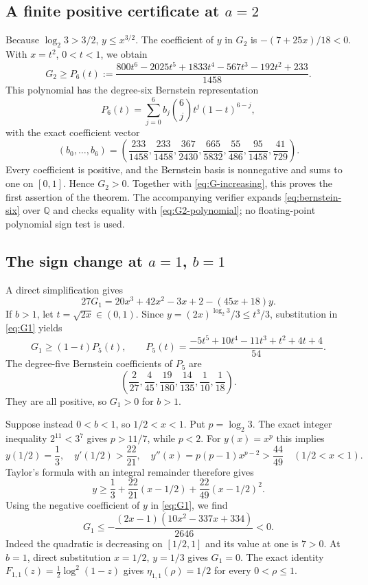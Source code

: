 \subsection{A finite positive certificate at \texorpdfstring{$a=2$}{a = 2}}
Because $\log_2 3>3/2$, $y\le x^{3/2}$. The coefficient of $y$
in $G_2$ is $-(7+25x)/18<0$. With $x=t^2$, $0<t<1$, we obtain
\begin{equation}\label{eq:G2-polynomial}
 G_2\ge P_6(t):=
 \frac{800t^6-2025t^5+1833t^4-567t^3-192t^2+233}{1458}.
\end{equation}
This polynomial has the degree-six Bernstein representation
\[
 P_6(t)=\sum_{j=0}^6 b_j\binom6j t^j(1-t)^{6-j},
\]
with the exact coefficient vector
\begin{equation}\label{eq:bernstein-six}
 (b_0,\ldots,b_6)=
 \left(\frac{233}{1458},\frac{233}{1458},\frac{367}{2430},
 \frac{665}{5832},\frac{55}{486},\frac{95}{1458},\frac{41}{729}\right).
\end{equation}
Every coefficient is positive, and the Bernstein basis is nonnegative
and sums to one on $[0,1]$. Hence $G_2>0$. Together with
\eqref{eq:G-increasing}, this proves the first assertion of the theorem.
The accompanying verifier expands \eqref{eq:bernstein-six} over
$\mathbb Q$ and checks equality with \eqref{eq:G2-polynomial}; no
floating-point polynomial sign test is used.

\subsection{The sign change at \texorpdfstring{$a=1$, $b=1$}{a = 1, b = 1}}
A direct simplification gives
\begin{equation}\label{eq:G1}
 27G_1=20x^3+42x^2-3x+2-(45x+18)y.
\end{equation}
If $b>1$, let $t=\sqrt{2x}\in(0,1)$. Since
$y=(2x)^{\log_2 3}/3\le t^3/3$, substitution in
\eqref{eq:G1} yields
\[
 G_1\ge(1-t)P_5(t),\qquad
 P_5(t)=\frac{-5t^5+10t^4-11t^3+t^2+4t+4}{54}.
\]
The degree-five Bernstein coefficients of $P_5$ are
\begin{equation}\label{eq:bernstein-five}
 \left(\frac2{27},\frac4{45},\frac{19}{180},
       \frac{14}{135},\frac1{10},\frac1{18}\right).
\end{equation}
They are all positive, so $G_1>0$ for $b>1$.

Suppose instead $0<b<1$, so $1/2<x<1$. Put $p=\log_2 3$.
The exact integer inequality $2^{11}<3^7$ gives $p>11/7$, while
$p<2$. For $y(x)=x^p$ this implies
\[
 y(1/2)=\frac13,\quad y'(1/2)>\frac{22}{21},\quad
 y''(x)=p(p-1)x^{p-2}>\frac{44}{49}\quad(1/2<x<1).
\]
Taylor's formula with an integral remainder therefore gives
\[
 y\ge\frac13+\frac{22}{21}(x-1/2)
                   +\frac{22}{49}(x-1/2)^2.
\]
Using the negative coefficient of $y$ in \eqref{eq:G1}, we find
\[
 G_1\le-\frac{(2x-1)(10x^2-337x+334)}{2646}<0.
\]
Indeed the quadratic is decreasing on $[1/2,1]$ and its value at
one is $7>0$. At $b=1$, direct substitution $x=1/2$, $y=1/3$
gives $G_1=0$. The exact identity
$F_{1,1}(z)=\tfrac12\log^2(1-z)$ gives
$\eta_{1,1}(\rho)=1/2$ for every $0<\rho\le1$.


